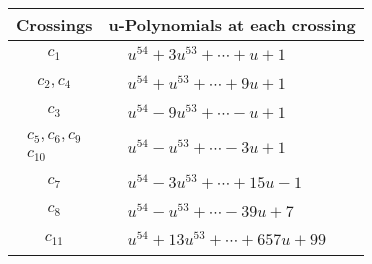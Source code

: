 \documentclass[1p]{elsarticle_modified}
\theoremstyle{definition}
\begin{document}
\begin{tabular}{m{50pt}|m{274pt}}
Crossings & \hspace{64pt}u-Polynomials at each crossing \\
\hline $$\begin{aligned}c_{1}\end{aligned}$$&$\begin{aligned}
&u^{54}+3 u^{53}+\cdots+u+1
\end{aligned}$\\
\hline $$\begin{aligned}c_{2},c_{4}\end{aligned}$$&$\begin{aligned}
&u^{54}+u^{53}+\cdots+9 u+1
\end{aligned}$\\
\hline $$\begin{aligned}c_{3}\end{aligned}$$&$\begin{aligned}
&u^{54}-9 u^{53}+\cdots- u+1
\end{aligned}$\\
\hline $$\begin{aligned}c_{5},c_{6},c_{9}\\c_{10}\end{aligned}$$&$\begin{aligned}
&u^{54}- u^{53}+\cdots-3 u+1
\end{aligned}$\\
\hline $$\begin{aligned}c_{7}\end{aligned}$$&$\begin{aligned}
&u^{54}-3 u^{53}+\cdots+15 u-1
\end{aligned}$\\
\hline $$\begin{aligned}c_{8}\end{aligned}$$&$\begin{aligned}
&u^{54}- u^{53}+\cdots-39 u+7
\end{aligned}$\\
\hline $$\begin{aligned}c_{11}\end{aligned}$$&$\begin{aligned}
&u^{54}+13 u^{53}+\cdots+657 u+99
\end{aligned}$\\
\hline
\end{tabular}\\~\\
\newpage\renewcommand{\arraystretch}{1}
\end{document}
